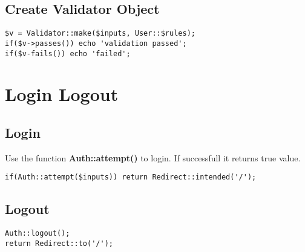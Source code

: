\documentclass[a4paper, 10pt]{article}
\begin{document}
\subsection{Create Validator Object}
\begin{verbatim}
$v = Validator::make($inputs, User::$rules);
if($v->passes()) echo 'validation passed';
if($v-fails()) echo 'failed';
\end{verbatim}

\section{Login Logout}
\subsection{Login}
Use the function \textbf{Auth::attempt()} to login.
If successfull it returns true value.
\begin{verbatim}
if(Auth::attempt($inputs)) return Redirect::intended('/');
\end{verbatim}
\subsection{Logout}
\begin{verbatim}
Auth::logout();
return Redirect::to('/');
\end{verbatim}
\end{document}
